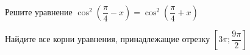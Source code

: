 \begin{ex}
	\begin{condition}
		\begin{enumcols}[label=\asbuk*)]
			\item Решите уравнение \( \cos^2{\left(\dfrac{\pi}{4} - x\right)}=\cos^2{\left(\dfrac{\pi}{4} + x\right)}  \)
			\item Найдите все корни уравнения, принадлежащие отрезку \( \left[3\pi;\dfrac{9\pi}{2}\right] \)
		\end{enumcols}
	\end{condition}
\end{ex}